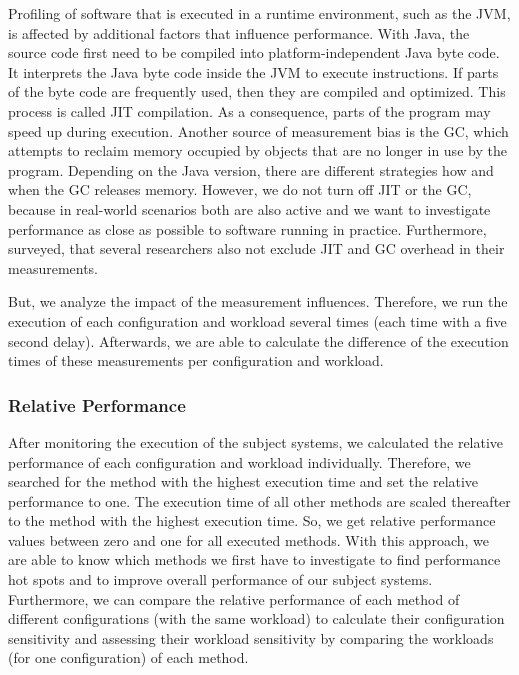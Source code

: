 
Profiling of software that is executed in a runtime environment, such as the \ac{JVM}, is affected by additional factors that influence performance. With Java, the source code first need to be compiled into platform-independent Java byte code. It interprets the Java byte code inside the \ac{JVM} to execute instructions. If parts of the byte code are frequently used, then they are compiled and optimized. This process is called \ac{JIT} compilation. As a consequence, parts of the program may speed up during execution. Another source of measurement bias is the \ac{GC}, which attempts to reclaim memory occupied by objects that are no longer in use by the program. Depending on the Java version, there are different strategies how and when the \ac{GC} releases memory. However, we do not turn off \ac{JIT} or the \ac{GC}, because in real-world scenarios both are also active and we want to investigate performance as close as possible to software running in practice. Furthermore, \cite{georges2007statistically2} surveyed, that several researchers also not exclude \ac{JIT} and \ac{GC} overhead in their measurements.

But, we analyze the impact of the measurement influences. Therefore, we run the execution of each configuration and workload several times (each time with a five second delay). Afterwards, we are able to calculate the difference of the execution times of these measurements per configuration and workload.


\subsubsection{Relative Performance}

After monitoring the execution of the subject systems, we calculated the relative performance of each configuration and workload individually. Therefore, we searched for the method with the highest execution time and set the relative performance to one. The execution time of all other methods are scaled thereafter to the method with the highest execution time. So, we get relative performance values between zero and one for all executed methods. With this approach, we are able to know which methods we first have to investigate to find performance hot spots and to improve overall performance of our subject systems. Furthermore, we can compare the relative performance of each method of different configurations (with the same workload) to calculate their configuration sensitivity and assessing their workload sensitivity by comparing the workloads (for one configuration) of each method.


